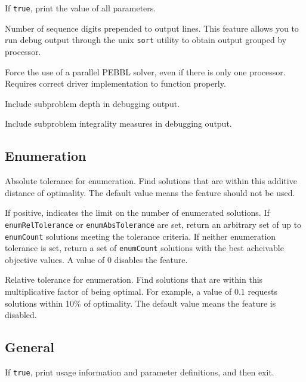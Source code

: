 If \texttt{true}, print the value of all parameters.

Number of sequence digits prepended to output lines.  This feature
allows you to run debug output through the unix \texttt{sort} utility
to obtain output grouped by processor.

 Force the use of a parallel PEBBL
solver, even if there is only one processor.  Requires correct driver
implementation to function properly.

Include subproblem depth in debugging output.

Include subproblem integrality measures in debugging output.


\subsection{Enumeration}
\vspace{-3ex}
Absolute tolerance for enumeration.  Find solutions
that are within this additive distance of optimality.  The default
value means the feature should not be used.

        If positive, indicates the
        limit on the number of enumerated solutions.
        If \texttt{enumRelTolerance} or \texttt{enumAbsTolerance}
        are set, return an
        arbitrary set of up to \texttt{enumCount} solutions meeting the
        tolerance criteria.  If neither enumeration tolerance
        is set, return a set of \texttt{enumCount} solutions with the
        best acheivable objective values.  A value of 0 disables the
        feature. 

        Relative tolerance for enumeration.  Find solutions
        that are within this multiplicative factor of being
        optimal.  For example, a value of $0.1$ requests solutions
        within 10\% of optimality.  The default value means the
        feature is disabled.


\subsection{General}
\vspace{-3ex}
If \texttt{true}, print usage information and parameter definitions, and then exit.


